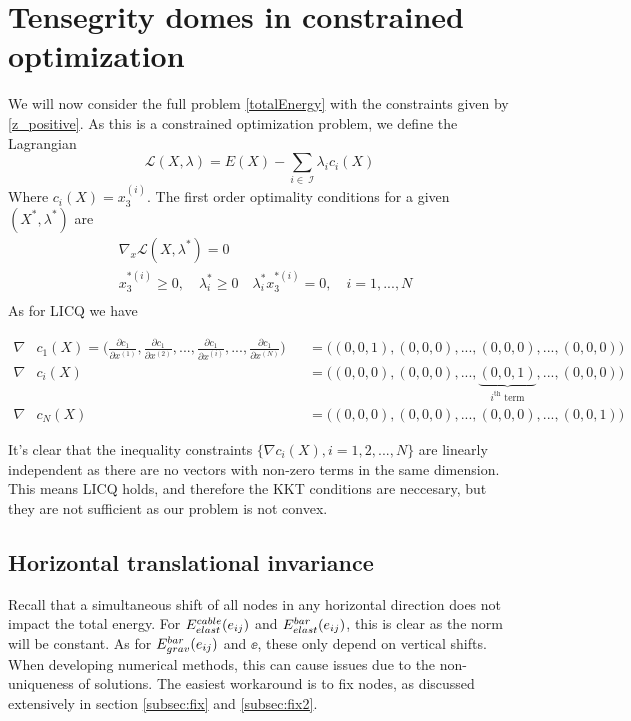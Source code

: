 \section{Tensegrity domes in constrained optimization}\label{sec:freestanding}
We will now consider the full problem \eqref{totalEnergy} with the constraints given by \eqref{z_positive}. As this is a constrained optimization problem, we define the Lagrangian \begin{equation}
    \mathcal{L}(X,\lambda) = E(X) - \sum_{i \in \ \mathcal{I}}\lambda_i c_i(X)
\end{equation}
Where $c_i(X) = x^{(i)}_3$. The first order optimality conditions for a given $(X^*,\lambda^*)$ are \begin{equation}
\begin{aligned}
       &\nabla_x \mathcal{L}(X,\lambda^*)=0\\ 
       &x^{*(i)}_3 \geq 0,\quad \lambda_i^* \geq 0 \quad \lambda_i^* x^{*(i)}_3 = 0,\quad i = 1,...,N\\
\end{aligned}
\end{equation}
As for LICQ we have 

\begin{align*}
    \nabla &c_1(X) = \bigg( \frac{\partial c_1}{\partial x^{(1)}},\frac{\partial c_1}{\partial x^{(2)}},...,\frac{\partial c_1}{\partial x^{(i)}},...,\frac{\partial c_1}{\partial x^{(N)}} \bigg) &&=\bigg( (0,0,1),(0,0,0),...,(0,0,0),...,(0,0,0) \bigg) \\
    \nabla &c_i(X) &&= \bigg( (0,0,0),(0,0,0),...,\underbrace{(0,0,1)}_{i^{\text{th}}\text{ term}},...,(0,0,0) \bigg)\\
    \nabla &c_N(X) &&=\bigg( (0,0,0),(0,0,0),...,(0,0,0),...,(0,0,1) \bigg)
\end{align*}

It's clear that the inequality constraints $\{\nabla c_i(X),i=1,2,...,N\}$ are linearly independent as there are no vectors with non-zero terms in the same dimension. This means LICQ holds, and therefore the KKT conditions are neccesary, but they are not sufficient as our problem is not convex.

\subsection{Horizontal translational invariance}\label{sec:invariance}
Recall that a simultaneous shift of all nodes in any horizontal direction does not impact the total energy. For $E^{cable}_{elast}(e_{ij})$ and $E^{bar}_{elast}(e_{ij})$, this is clear as the norm will be constant. As for $E^{bar}_{grav}(e_{ij})$ and $\ee$, these only depend on vertical shifts. When developing numerical methods, this can cause issues due to the non-uniqueness of solutions. The easiest workaround is to fix nodes, as discussed extensively in section \ref{subsec:fix} and \ref{subsec:fix2}.

